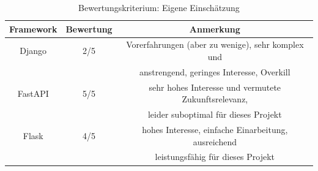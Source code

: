 \documentclass[letterpaper,11pt,leqno]{article}
\begin{document}
\begin{table}[h!]
	\begin{center}
		\begin{tabular}{|c||c|c|}
			\hline
			Framework & Bewertung & Anmerkung\\
			\hline\hline
			Django & 2/5 & Vorerfahrungen (aber zu wenige), sehr komplex und\\
			& & anstrengend, geringes Interesse, Overkill\\
			FastAPI & 5/5 & sehr hohes Interesse und vermutete Zukunftsrelevanz,\\
			& & leider suboptimal für dieses Projekt\\
			Flask & 4/5 & hohes Interesse, einfache Einarbeitung, ausreichend\\
			& & leistungsfähig für dieses Projekt\\
			\hline
		\end{tabular}
		\caption{Bewertungskriterium: Eigene Einschätzung}
	\end{center}
	\label{table:6}
\end{table}
\end{document}
